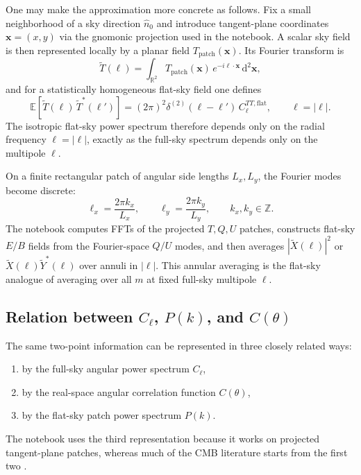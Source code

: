 \documentclass[11pt]{article}
\newcommand{\EE}{\mathbb{E}}
\newcommand{\dd}{\mathrm{d}}
\begin{document}
One may make the approximation more concrete as follows. Fix a small neighborhood of a sky direction \(\hat n_0\) and introduce tangent-plane coordinates \(\bm{x}=(x,y)\) via the gnomonic projection used in the notebook. A scalar sky field is then represented locally by a planar field \(T_{\mathrm{patch}}(\bm{x})\). Its Fourier transform is
\begin{equation}
  \widetilde T(\bm{\ell})
  =
  \int_{\mathbb R^2} T_{\mathrm{patch}}(\bm{x})\,e^{-i\bm{\ell}\cdot\bm{x}}\,\dd^2\bm{x},
\end{equation}
and for a statistically homogeneous flat-sky field one defines
\begin{equation}
  \EE\!\left[\widetilde T(\bm{\ell})\,\widetilde T^\ast(\bm{\ell}')\right]
  =
  (2\pi)^2 \delta^{(2)}(\bm{\ell}-\bm{\ell}')\,C_\ell^{TT,\mathrm{flat}},
  \qquad \ell = |\bm{\ell}|.
\end{equation}
The isotropic flat-sky power spectrum therefore depends only on the radial frequency \(\ell=|\bm{\ell}|\), exactly as the full-sky spectrum depends only on the multipole \(\ell\).

On a finite rectangular patch of angular side lengths \(L_x,L_y\), the Fourier modes become discrete:
\begin{equation}
  \ell_x = \frac{2\pi k_x}{L_x},
  \qquad
  \ell_y = \frac{2\pi k_y}{L_y},
  \qquad
  k_x,k_y\in\mathbb Z.
\end{equation}
The notebook computes FFTs of the projected \(T,Q,U\) patches, constructs flat-sky \(E/B\) fields from the Fourier-space \(Q/U\) modes, and then averages \(|\widetilde X(\bm{\ell})|^2\) or \(\widetilde X(\bm{\ell})\widetilde Y^\ast(\bm{\ell})\) over annuli in \(|\bm{\ell}|\). This annular averaging is the flat-sky analogue of averaging over all \(m\) at fixed full-sky multipole \(\ell\).

\subsection{Relation between \(C_\ell\), \(P(k)\), and \(C(\theta)\)}

The same two-point information can be represented in three closely related ways:
\begin{enumerate}[leftmargin=1.5em]
  \item by the full-sky angular power spectrum \(C_\ell\),
  \item by the real-space angular correlation function \(C(\theta)\),
  \item by the flat-sky patch power spectrum \(P(k)\).
\end{enumerate}
The notebook uses the third representation because it works on projected tangent-plane patches, whereas much of the CMB literature starts from the first two \cite{zaldarriaga1997,kamionkowski1997}.
\end{document}

